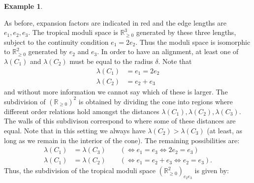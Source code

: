 \documentclass[11pt]{amsart}
\newcommand{\mathsq}[1]{#1}
\newcommand{\PP}{\mathbb P}
\newcommand{\RR}{\mathbb{R}}
\theoremstyle{definition}
\theoremstyle{definition}
\newtheorem{example}[thm]{Example}
\begin{document}
\begin{example}
\begin{center}
\end{center}
As before, expansion factors are indicated in red and the edge lengths are $e_1,e_2,e_3$. The tropical moduli space is $\RR_{\geq 0}^3$ generated by these three lengths, subject to the continuity condition $e_1=2e_2$. Thus the moduli space is isomorphic to $\RR_{\geq 0}^2$ generated by $e_2$ and $e_3$. In order to have an alignment, at least one of $\lambda(\mathsq{C}_1)$ and $\lambda(\mathsq{C}_2)$ must be equal to the radius $\delta$. Note that
\begin{align*} \lambda(\mathsq{C}_1) & = e_1 = 2e_2 \\
\lambda(\mathsq{C}_2) & = e_2 + e_3\end{align*}
and without more information we cannot say which of these is larger. The subdivision of $(\RR_{\geq 0})^2$ is obtained by dividing the cone into regions where different order relations hold amongst the distances $\lambda(\mathsq{C}_1),\lambda(\mathsq{C}_2),\lambda(\mathsq{C}_3)$. The walls of this subdivison correspond to where some of these distances are equal. Note that in this setting we always have $\lambda(\mathsq{C}_2) > \lambda(\mathsq{C}_3)$ (at least, as long as we remain in the interior of the cone). The remaining possibilities are:
\begin{align*} \lambda(\mathsq{C}_1) & = \lambda(\mathsq{C}_3) \qquad (\Leftrightarrow e_1 = e_3 \Leftrightarrow 2e_2 = e_3) \\
\lambda(\mathsq{C}_1) & = \lambda(\mathsq{C}_2) \qquad (\Leftrightarrow e_1 = e_2 + e_3 \Leftrightarrow e_2 = e_3). \end{align*}
Thus, the subdivision of the tropical moduli space $(\RR_{\geq 0}^2)_{e_2 e_3}$ is given by:
\begin{center}
\end{center}
\end{example}
\end{document}
